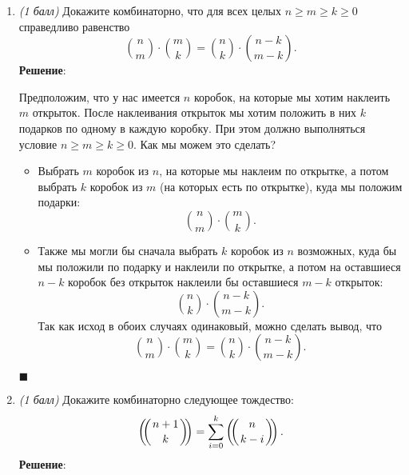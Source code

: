 \documentclass{article}
\def\multiset#1#2{\ensuremath{\left(\kern-.3em\left(\genfrac{}{}{0pt}{}{#1}{#2}\right)\kern-.3em\right)}}
\begin{document}
  \begin{enumerate}
    \item \textit{(1 балл)} Докажите комбинаторно, что для всех целых $n \geq m \geq k \geq 0$ справедливо равенство
    $$\binom{n}{m} \cdot \binom{m}{k} = \binom{n}{k} \cdot \binom{n - k}{m - k}.$$
    \textbf{Решение}:

    Предположим, что у нас имеется $n$ коробок, на которые мы хотим наклеить $m$ открыток. После наклеивания открыток мы хотим положить в них $k$ подарков по одному в каждую коробку. При этом должно выполняться условие $n \geq m \geq k \geq 0$. Как мы можем это сделать?
    \begin{itemize}
      \item Выбрать $m$ коробок из $n$, на которые мы наклеим по открытке, а потом выбрать $k$ коробок из $m$ (на которых есть по открытке), куда мы положим подарки:
      \begin{equation}
        \binom{n}{m} \cdot \binom{m}{k}.
      \end{equation}
      \item Также мы могли бы сначала выбрать $k$ коробок из $n$ возможных, куда бы мы положили по подарку и наклеили по открытке, а потом на оставшиеся $n-k$ коробок без открыток наклеили бы оставшиеся $m-k$ открыток:
      \begin{equation}
        \binom{n}{k} \cdot \binom{n - k}{m - k}.
      \end{equation}
      Так как исход в обоих случаях одинаковый, можно сделать вывод, что
      \begin{equation}
        \binom{n}{m} \cdot \binom{m}{k} = \binom{n}{k} \cdot \binom{n - k}{m - k}.
      \end{equation}
    \end{itemize}
    \begin{flushright}
      $\blacksquare$
    \end{flushright}
    \item \textit{(1 балл)} Докажите комбинаторно следующее тождество:
    $$\multiset{n + 1}{k} = \sum_{i = 0}^{k} \multiset{n}{k - i}.$$
    \textbf{Решение}:


\end{enumerate}
\end{document}
